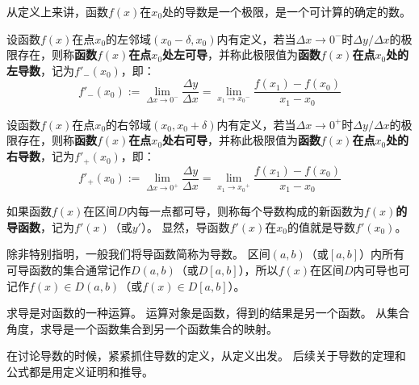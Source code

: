 从定义上来讲，函数$f\left( x \right) $在$x_0$处的导数是一个极限，是一个可计算的确定的数。

\begin{definition}[左导数]
设函数$f\left( x \right) $在点$x_0$的左邻域$\left( x_0-\delta ,x_0 \right) $内有定义，若当$\Delta x\rightarrow 0^-$时$\Delta y/\Delta x$的极限存在，则称{\bf 函数$f\left( x \right) $在点$x_0$处左可导}，并称此极限值为{\bf 函数$f\left( x \right) $在点$x_0$处的左导数}，记为$f'_-\left( x_0 \right) $，即：
\[
f'_-\left( x_0 \right) :=\underset{\Delta x\rightarrow 0^-}{\lim}\frac{\Delta y}{\Delta x}=\underset{x_1\rightarrow {x_0}^-}{\lim}\frac{f\left( x_1 \right) -f\left( x_0 \right)}{x_1-x_0}
\]
\end{definition}

\begin{definition}[右导数]
设函数$f\left( x \right) $在点$x_0$的右邻域$\left( x_0,x_0+\delta \right) $内有定义，若当$\Delta x\rightarrow 0^+$时$\Delta y/\Delta x$的极限存在，则称{\bf 函数$f\left( x \right) $在点$x_0$处右可导}，并称此极限值为{\bf 函数$f\left( x \right) $在点$x_0$处的右导数}，记为$f'_+\left( x_0 \right) $，即：
\[
f'_+\left( x_0 \right) :=\underset{\Delta x\rightarrow 0^+}{\lim}\frac{\Delta y}{\Delta x}=\underset{x_1\rightarrow {x_0}^+}{\lim}\frac{f\left( x_1 \right) -f\left( x_0 \right)}{x_1-x_0}
\]
\end{definition}

\begin{definition}[导函数]
如果函数$f\left( x \right) $在区间$D$内每一点都可导，则称每个导数构成的新函数为{\bf $f\left( x \right) $的导函数}，记为$f'\left( x \right) $（或$y'$）。
显然，导函数$f'\left( x \right) $在$x_0$的值就是导数$f'\left( x_0 \right) $。
\end{definition}

除非特别指明，一般我们将导函数简称为导数。
区间$\left( a,b \right) $（或$\left[ a,b \right] $）内所有可导函数的集合通常记作$D\left( a,b \right) $（或$D\left[ a,b \right] $），所以$f\left( x \right) $在区间$D$内可导也可记作$f\left( x \right) \in D\left( a,b \right) $（或$f\left( x \right) \in D\left[ a,b \right] $）。

求导是对函数的一种运算。
运算对象是函数，得到的结果是另一个函数。
从集合角度，求导是一个函数集合到另一个函数集合的映射。

\begin{tcolorbox}
在讨论导数的时候，紧紧抓住导数的定义，从定义出发。
后续关于导数的定理和公式都是用定义证明和推导。
\end{tcolorbox}


